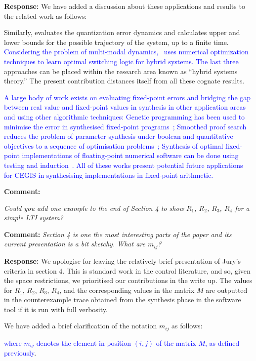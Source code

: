 \documentclass{article}
\newcommand{\rev}[1]{\textcolor{blue}{#1}}
\begin{document}
\vspace{1em}
{\bf Response: }
We have added a discussion about these applications and results to the related work as follows:

\vspace{2em}

Similarly, 
\cite{liberzon2003hybrid} evaluates the quantization error dynamics and calculates upper and lower
bounds for the possible trajectory of the system, up to a finite time. \rev{Considering the problem of multi-modal
dynamics,~\cite{DBLP:conf/emsoft/JhaST11} uses numerical optimization techniques to learn optimal switching logic for hybrid systems.
The last three} approaches can be placed within the research area known as ``hybrid systems theory.''  
The present contribution distances itself from all these cognate results. 

\rev{A large body of work exists on evaluating fixed-point errors and bridging the gap between real value
and fixed-point values in synthesis in other application areas and using other
algorithmic techniques:
Genetic programming has been used to minimise the error in synthesised fixed-point programs~\cite{DBLP:conf/emsoft/DarulovaKMS13};
Smoothed proof search reduces the problem of parameter synthesis under boolean and quantitative 
objectives to a sequence of optimisation problems~\cite{DBLP:conf/popl/ChaudhuriCS14}; Synthesis of 
optimal fixed-point implementations of floating-point numerical software can be done using testing and induction~\cite{DBLP:journals/corr/abs-1302-1920}.
All of these works present potential future applications for CEGIS in synthesising implementations in fixed-point arithmetic.}

\vspace{2em}
{\bf Comment: } {\itshape 
Could you add one example to the end of Section 4 to show $R_1$, $R_2$, $R_3$, $R_4$ for a simple LTI system? 

{\bf Comment: } {\itshape 
Section 4 is one the most interesting parts
of the paper and its current presentation is a bit sketchy. What are $m_{ij}$?} } 

\vspace{1em}
{\bf Response: }
We apologise for leaving the relatively brief presentation of Jury's criteria in section 4. This is standard
work in the control literature, and so, given the space restrictions, we prioritised our contributions in the write up. 
The values for $R_1$, $R_2$, $R_3$, $R_4$, and the corresponding values in the matrix $M$ are outputted in the counterexample
trace obtained from the synthesis phase in the software tool 
if it is run with full verbosity.

We have added a brief clarification of the notation $m_{ij}$ as follows:

\rev{where $m_{ij}$ denotes the element in position $(i,j)$ of the matrix $M$, as defined previously}.




\end{document}
